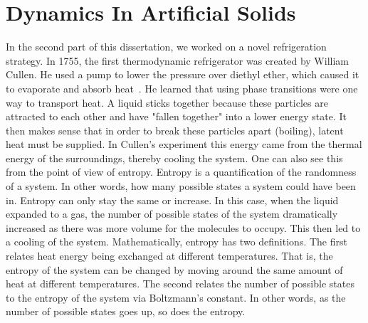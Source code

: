 \section{Dynamics In Artificial Solids}
In the second part of this dissertation, we worked on a novel refrigeration strategy. In 1755, the first thermodynamic refrigerator was created by William Cullen. He used a pump to lower the pressure over diethyl ether, which caused it to evaporate and absorb heat~\cite{Chandra??}. He learned that using phase transitions were one way to transport heat. A liquid sticks together because these particles are attracted to each other and have "fallen together" into a lower energy state. It then makes sense that in order to break these particles apart (boiling), latent heat must be supplied. In Cullen's experiment this energy came from the thermal energy of the surroundings, thereby cooling the system. One can also see this from the point of view of entropy. Entropy is a quantification of the randomness of a system. In other words, how many possible states a system could have been in. Entropy can only stay the same or increase. In this case, when the liquid expanded to a gas, the number of possible states of the system dramatically increased as there was more volume for the molecules to occupy. This then led to a cooling of the system. 
	Mathematically, entropy has two definitions. The first relates heat energy being exchanged at different temperatures. That is, the entropy of the system can be changed by moving around the same amount of heat at different temperatures. The second relates the number of possible states to the entropy of the system via Boltzmann's constant. In other words, as the number of possible states goes up, so does the entropy.
